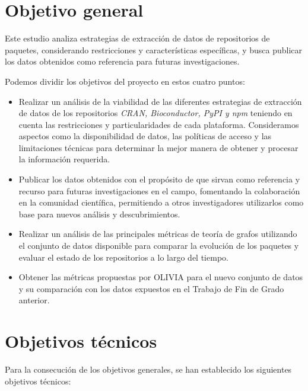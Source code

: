 

\section{Objetivo general}

Este estudio analiza estrategias de extracción de datos de repositorios 
de paquetes, considerando restricciones y características específicas, y busca publicar 
los datos obtenidos como referencia para futuras investigaciones.

Podemos dividir los objetivos del proyecto en estos cuatro puntos:

\begin{itemize}
    \item Realizar un análisis de la viabilidad de las diferentes estrategias de extracción de datos de los repositorios 
    \textit{CRAN, Bioconductor, PyPI y npm} teniendo en cuenta las restricciones y particularidades de cada plataforma. 
    Consideramos aspectos como la disponibilidad de datos, las políticas de acceso y las limitaciones técnicas 
    para determinar la mejor manera de obtener y procesar la información requerida.
    \item Publicar los datos obtenidos con el propósito de que sirvan como referencia y recurso para futuras investigaciones en el campo, fomentando la colaboración en la comunidad científica, permitiendo a otros investigadores utilizarlos como base para nuevos análisis y descubrimientos.
    \item Realizar un análisis de las principales métricas de teoría de grafos utilizando el conjunto de datos disponible para comparar la evolución de los paquetes y evaluar el estado de los repositorios a lo largo del tiempo.
    \item Obtener las métricas propuestas por OLIVIA para el nuevo conjunto de datos y su comparación con los datos expuestos en el Trabajo de Fin de Grado anterior.
    \end{itemize}


\section{Objetivos técnicos}

Para la consecución de los objetivos generales, se han establecido los siguientes objetivos técnicos:

